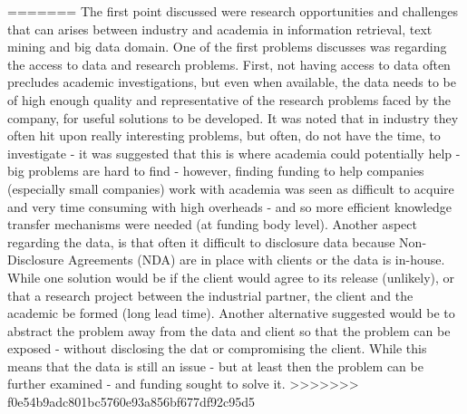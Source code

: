 =======
The first point discussed were research opportunities and challenges that can arises between industry and academia in information retrieval, text mining and big data domain. One of the first problems discusses was regarding the access to data and research problems. First, not having access to data often precludes academic investigations,  but even when available, the data needs to be of high enough quality and representative of the research problems faced by the company, for useful solutions to be developed. It was noted that in industry they often hit upon really interesting problems, but often, do not have the time, to investigate - it was suggested that this is where academia could potentially help - big problems are hard to find - however, finding funding to help companies (especially small companies) work with academia was seen as difficult to acquire and very time consuming with high overheads - and so more efficient knowledge transfer mechanisms were needed (at funding body level). Another aspect regarding the data, is that often it difficult to disclosure data because Non-Disclosure Agreements (NDA) are in place with clients or the data is in-house. While one solution would be if the client would agree to its release (unlikely), or that a research project between the industrial partner, the client and the academic be formed (long lead time). Another alternative suggested would be to abstract the problem away from the data and client so that the problem can be exposed - without disclosing the dat or compromising the client. While this means that the data is still an issue - but at least then the problem can be further examined - and funding sought to solve it. 
>>>>>>> f0e54b9adc801bc5760e93a856bf677df92c95d5



